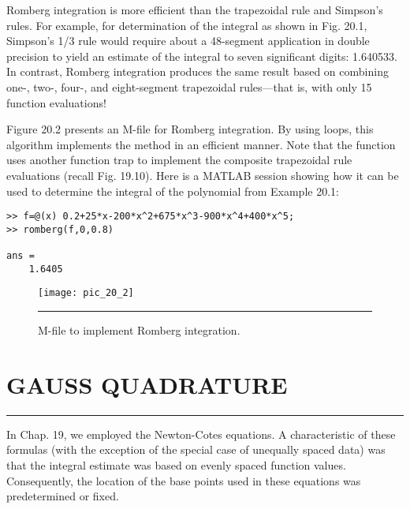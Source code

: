 \documentclass[../main.tex]{subfiles}
\begin{document}
Romberg integration is more efficient than the trapezoidal rule and Simpson's rules.
For example, for determination of the integral as shown in Fig. 20.1, Simpson's 1/3 rule
would require about a 48-segment application in double precision to yield an estimate of
the integral to seven significant digits: 1.640533. In contrast, Romberg integration produces the same result based on combining one-, two-, four-, and eight-segment trapezoidal
rules—that is, with only 15 function evaluations!

Figure 20.2 presents an M-file for Romberg integration. By using loops, this algorithm
implements the method in an efficient manner. Note that the function uses another function
trap to implement the composite trapezoidal rule evaluations (recall Fig. 19.10). Here is
a MATLAB session showing how it can be used to determine the integral of the polynomial
from Example 20.1:

\begin{verbatim}
>> f=@(x) 0.2+25*x-200*x^2+675*x^3-900*x^4+400*x^5;
>> romberg(f,0,0.8)

ans =
    1.6405
\end{verbatim}

\begin{figure}[hbt!]
	\centering
	\texttt{[image: pic\_20\_2]}
	\caption{\textsf{M-file to implement Romberg integration.}} \hrule
	\label{pic.20.2}
\end{figure}

\vspace{0,3in}
\section{GAUSS QUADRATURE}
\vspace{0,1in}
\hrule
\vspace{0,1in}
In Chap. 19, we employed the Newton-Cotes equations. A characteristic of these formulas
(with the exception of the special case of unequally spaced data) was that the integral estimate was based on evenly spaced function values. Consequently, the location of the base
points used in these equations was predetermined or fixed.
\end{document}
